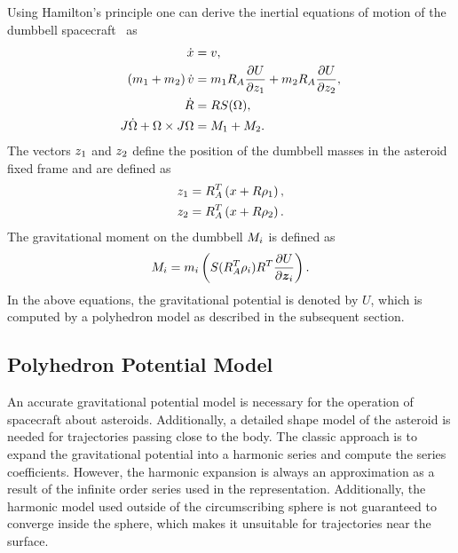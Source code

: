 \documentclass[journal]{new-aiaa}
\begin{document}
Using Hamilton's principle one can derive the inertial equations of motion of the dumbbell spacecraft~\cite{kulumani2017b} as
\begin{align}
    \dot{x} &= v, \\
    \left( m_1 + m_2 \right) \dot{v} &= m_1 R_A \frac{\partial U}{\partial z_1} + m_2 R_A \frac{\partial U}{\partial z_2}, \\
    \dot{R} &= R S(\Omega) , \\
    J \dot{\Omega} + \Omega \times J \Omega &= M_1 + M_2.
\end{align}
The vectors \( z_1 \) and \( z_2\) define the position of the dumbbell masses in the asteroid fixed frame and are defined as
\begin{align}
    z_1 &= R_A^T \left( x + R \rho_1 \right) , \\
    z_2 &= R_A^T \left( x + R \rho_2 \right).
\end{align}
The gravitational moment on the dumbbell \( M_i\) is defined as
\begin{align}
    M_i = m_i \left( S(R_A^T \rho_i) R^T \frac{\partial U}{\partial \bm{z}_i} \right).
\end{align}
In the above equations, the gravitational potential is denoted by $U$, which is computed by a polyhedron model as described in the subsequent section. 



\subsection{Polyhedron Potential Model}\label{sec:polyhedron_potential}

An accurate gravitational potential model is necessary for the operation of spacecraft about asteroids.
Additionally, a detailed shape model of the asteroid is needed for trajectories passing close to the body.
The classic approach is to expand the gravitational potential into a harmonic series and compute the series coefficients.
However, the harmonic expansion is always an approximation as a result of the infinite order series used in the representation.
Additionally, the harmonic model used outside of the circumscribing sphere is not guaranteed to converge inside the sphere, which makes it unsuitable for trajectories near the surface.
\end{document}
